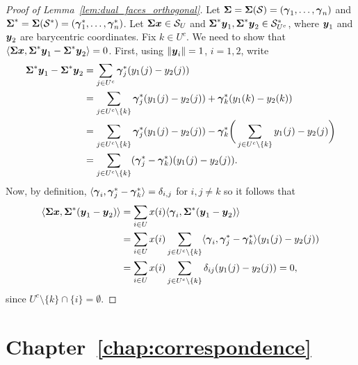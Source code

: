 \begin{proof}[Proof of Lemma~\ref{lem:dual_faces_orthogonal}]
	Let $\boldsymbol{\Sigma}=\boldsymbol{\Sigma}(\mathcal{S})=(\vb*{\gamma}_1,\dots,\vb*{\gamma}_n)$ and $\boldsymbol{\Sigma}^*=\boldsymbol{\Sigma}(\mathcal{S}^*)=(\vb*{\gamma}^*_1,\dots,\vb*{\gamma}^*_n)$.  Let $\boldsymbol{\Sigma}\vb*{x}\in \mathcal{S}_U$ and $\boldsymbol{\Sigma}^*\vb*{y}_1,\boldsymbol{\Sigma}^*\vb*{y}_2\in \mathcal{S}^*_{U^c}$, where $\vb*{y}_1$ and $\vb*{y}_2$ are barycentric coordinates. Fix $k\in U^c$. We need to show that $\langle \boldsymbol{\Sigma}\vb*{x},\boldsymbol{\Sigma}^*\vb*{y}_1-\boldsymbol{\Sigma}^*\vb*{y}_2\rangle =0$. First, using $\norm{\vb*{y}_i}=1$, $i=1,2$, write
	\begin{align*}
	\boldsymbol{\Sigma}^*\vb*{y}_1 - \boldsymbol{\Sigma}^*\vb*{y}_2 &= \sum_{j\in U^c} \vb*{\gamma}^*_j(y_1(j)-y_2(j)) \\
	&=\sum_{j\in U^c\setminus \{k\}} \vb*{\gamma}^*_j(y_1(j)-y_2(j)) + \vb*{\gamma}^*_k(y_1(k)-y_2(k)) \\
	&= \sum_{j\in U^c\setminus\{k\}}\vb*{\gamma}^*_j(y_1(j)-y_2(j))  -\vb*{\gamma}^*_k\bigg(\sum_{j\in U^c\setminus \{k\}} y_1(j)-y_2(j)\bigg) \\
	&= \sum_{j\in U^c\setminus\{k\}} (\vb*{\gamma}^*_j-\vb*{\gamma}^*_k)(y_1(j)-y_2(j)). 
	\end{align*}
	Now, by definition, $\langle \vb*{\gamma}_i,\vb*{\gamma}^*_j-\vb*{\gamma}^*_k\rangle = \delta_{i,j}$ for $i,j\neq k$ so it follows that 
	\begin{align*}
	\langle \boldsymbol{\Sigma}\vb*{x},\boldsymbol{\Sigma}^*(\vb*{y}_1-\vb*{y}_2)\rangle &= \sum_{i\in U} x(i)\langle \vb*{\gamma}_i,\boldsymbol{\Sigma}^*(\vb*{y}_1-\vb*{y}_2)\rangle \\
	&= \sum_{i\in U}x(i)\sum_{j\in U^c\setminus \{k\}} \langle \vb*{\gamma}_i,\vb*{\gamma}^*_j-\vb*{\gamma}^*_k\rangle (y_1(j)-y_2(j)) \\
	&=\sum_{i\in U} x(i) \sum_{j\in U^c\setminus\{k\}} \delta_{ij}(y_1(j)-y_2(j)) = 0, 
	\end{align*}
	since $U^c\setminus\{k\}\cap\{i\}=\emptyset$. 
\end{proof}



\section{Chapter~\ref{chap:correspondence}}
\label{sec:app_proofs_correspondence}

